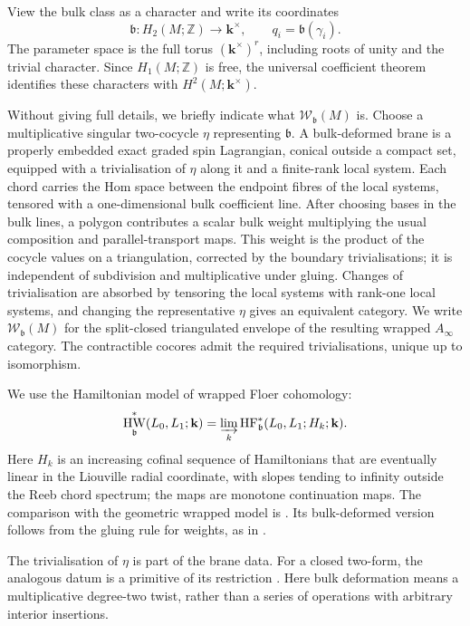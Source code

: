 \documentclass[a4paper]{amsart}
\newcommand{\kk}{\mathbf{k}}
\newcommand{\ZZ}{\mathbb{Z}}
\DeclareMathOperator{\HW}{HW}
\numberwithin{equation}{section}
\begin{document}
View the bulk class as a character and write its coordinates
\begin{equation}\label{eq:bulk-parameters}
 \mathfrak{b}:H_2(M;\ZZ)\longrightarrow\kk^\times,
 \qquad q_i=\mathfrak{b}(\gamma_i).
\end{equation}
The parameter space is the full
torus $(\kk^\times)^r$, including roots of unity and the trivial
character. Since $H_1(M;\ZZ)$ is free, the universal coefficient
theorem identifies these characters with $H^2(M;\kk^\times)$.

Without giving full details, we briefly indicate what
$\mathcal W_{\mathfrak b}(M)$ is. Choose a multiplicative singular
two-cocycle $\eta$ representing $\mathfrak b$. A bulk-deformed brane is
a properly embedded exact graded spin Lagrangian, conical outside a
compact set, equipped with a trivialisation of $\eta$ along it and a
finite-rank local system. Each chord carries the Hom space between the endpoint
fibres of the local systems, tensored with a one-dimensional bulk
coefficient line. After choosing bases in the bulk lines, a polygon
contributes a scalar bulk weight multiplying the usual composition
and parallel-transport maps. This weight is the product of the cocycle
values on a triangulation, corrected by the boundary trivialisations;
it is independent of subdivision and multiplicative under gluing.
Changes of trivialisation are absorbed by tensoring the local systems
with rank-one local systems, and changing the representative $\eta$
gives an equivalent category. We write $\mathcal W_{\mathfrak b}(M)$
for the split-closed triangulated envelope of the resulting wrapped
$A_\infty$ category. The contractible cocores admit the required
trivialisations, unique up to isomorphism.

We use the Hamiltonian model of wrapped Floer cohomology:
\[
 \HW^*_{\mathfrak b}(L_0,L_1;\kk)
 =\varinjlim_k \operatorname{HF}^*_{\mathfrak b}(L_0,L_1;H_k;\kk).
\]
Here $H_k$ is an increasing cofinal sequence of Hamiltonians that are
eventually linear in the Liouville radial coordinate, with slopes tending
to infinity outside the Reeb chord spectrum; the maps are monotone
continuation maps. The comparison with the geometric wrapped model is
\cite[Appendix~B.1.1, Lemmas~79--80]{ELduality}. Its bulk-deformed
version follows from the gluing rule for weights, as in
.

The trivialisation of $\eta$ is part of the brane data. For a closed
two-form, the analogous datum is a primitive of its restriction
\cite[Section~3.1, Remark~3.2]{SiegelTwist}. Here bulk deformation means
a multiplicative degree-two twist, rather than a series of operations
with arbitrary interior insertions.
\end{document}
